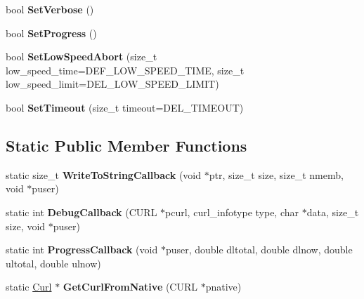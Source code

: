 \begin{DoxyCompactItemize}
\item 
\hypertarget{classlsf_1_1asio_1_1Curl_a6f0a1a356d556aaf054e30a7bb3a7496}{
bool {\bfseries SetVerbose} ()}
\label{classlsf_1_1asio_1_1Curl_a6f0a1a356d556aaf054e30a7bb3a7496}

\item 
\hypertarget{classlsf_1_1asio_1_1Curl_aa5d49cc57335b8b4fdacd86add039f20}{
bool {\bfseries SetProgress} ()}
\label{classlsf_1_1asio_1_1Curl_aa5d49cc57335b8b4fdacd86add039f20}

\item 
\hypertarget{classlsf_1_1asio_1_1Curl_a5ee791ac2450d8bfa360e297bc1eb116}{
bool {\bfseries SetLowSpeedAbort} (size\_\-t low\_\-speed\_\-time=DEF\_\-LOW\_\-SPEED\_\-TIME, size\_\-t low\_\-speed\_\-limit=DEL\_\-LOW\_\-SPEED\_\-LIMIT)}
\label{classlsf_1_1asio_1_1Curl_a5ee791ac2450d8bfa360e297bc1eb116}

\item 
\hypertarget{classlsf_1_1asio_1_1Curl_ab8494bdb96e8e62adc6d89ac347cf27d}{
bool {\bfseries SetTimeout} (size\_\-t timeout=DEL\_\-TIMEOUT)}
\label{classlsf_1_1asio_1_1Curl_ab8494bdb96e8e62adc6d89ac347cf27d}

\end{DoxyCompactItemize}
\subsection*{Static Public Member Functions}
\begin{DoxyCompactItemize}
\item 
\hypertarget{classlsf_1_1asio_1_1Curl_aaa3029239bdfea7808d0271e4224c694}{
static size\_\-t {\bfseries WriteToStringCallback} (void $\ast$ptr, size\_\-t size, size\_\-t nmemb, void $\ast$puser)}
\label{classlsf_1_1asio_1_1Curl_aaa3029239bdfea7808d0271e4224c694}

\item 
\hypertarget{classlsf_1_1asio_1_1Curl_a30773f78299b8756f46c1d8dad5ad6f2}{
static int {\bfseries DebugCallback} (CURL $\ast$pcurl, curl\_\-infotype type, char $\ast$data, size\_\-t size, void $\ast$puser)}
\label{classlsf_1_1asio_1_1Curl_a30773f78299b8756f46c1d8dad5ad6f2}

\item 
\hypertarget{classlsf_1_1asio_1_1Curl_afb0412c988b01abb1c35485a87661d90}{
static int {\bfseries ProgressCallback} (void $\ast$puser, double dltotal, double dlnow, double ultotal, double ulnow)}
\label{classlsf_1_1asio_1_1Curl_afb0412c988b01abb1c35485a87661d90}

\item 
\hypertarget{classlsf_1_1asio_1_1Curl_ab68a049cfbbeeaebebd64564a8d8fd2e}{
static \hyperlink{classlsf_1_1asio_1_1Curl}{Curl} $\ast$ {\bfseries GetCurlFromNative} (CURL $\ast$pnative)}
\label{classlsf_1_1asio_1_1Curl_ab68a049cfbbeeaebebd64564a8d8fd2e}

\end{DoxyCompactItemize}
